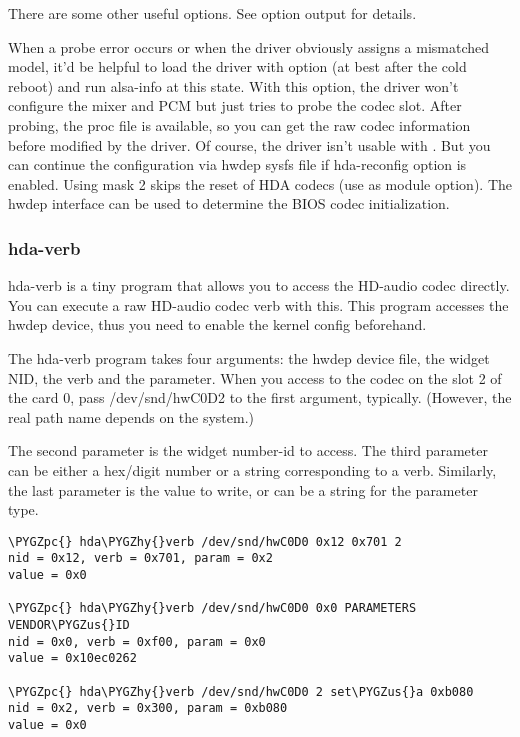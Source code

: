 \documentclass[a4paper,8pt,english]{sphinxmanual}
\def\PYGZus{\char`\_}
\def\PYGZpc{\char`\%}
\def\PYGZhy{\char`\-}
\begin{document}
There are some other useful options.  See  option output for
details.

When a probe error occurs or when the driver obviously assigns a
mismatched model, it'd be helpful to load the driver with
 option (at best after the cold reboot) and run
alsa-info at this state.  With this option, the driver won't configure
the mixer and PCM but just tries to probe the codec slot.  After
probing, the proc file is available, so you can get the raw codec
information before modified by the driver.  Of course, the driver
isn't usable with .  But you can continue the
configuration via hwdep sysfs file if hda-reconfig option is enabled.
Using  mask 2 skips the reset of HDA codecs (use
 as module option). The hwdep interface can be used
to determine the BIOS codec initialization.


\subsubsection{hda-verb}
\label{sound/hd-audio/notes:hda-verb}
hda-verb is a tiny program that allows you to access the HD-audio
codec directly.  You can execute a raw HD-audio codec verb with this.
This program accesses the hwdep device, thus you need to enable the
kernel config  beforehand.

The hda-verb program takes four arguments: the hwdep device file, the
widget NID, the verb and the parameter.  When you access to the codec
on the slot 2 of the card 0, pass /dev/snd/hwC0D2 to the first
argument, typically.  (However, the real path name depends on the
system.)

The second parameter is the widget number-id to access.  The third
parameter can be either a hex/digit number or a string corresponding
to a verb.  Similarly, the last parameter is the value to write, or
can be a string for the parameter type.

\begin{Verbatim}[commandchars=\\\{\}]
\PYGZpc{} hda\PYGZhy{}verb /dev/snd/hwC0D0 0x12 0x701 2
nid = 0x12, verb = 0x701, param = 0x2
value = 0x0

\PYGZpc{} hda\PYGZhy{}verb /dev/snd/hwC0D0 0x0 PARAMETERS VENDOR\PYGZus{}ID
nid = 0x0, verb = 0xf00, param = 0x0
value = 0x10ec0262

\PYGZpc{} hda\PYGZhy{}verb /dev/snd/hwC0D0 2 set\PYGZus{}a 0xb080
nid = 0x2, verb = 0x300, param = 0xb080
value = 0x0
\end{Verbatim}
\end{document}
